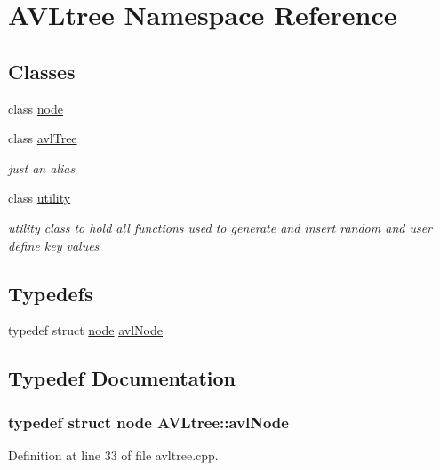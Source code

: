 \hypertarget{namespace_a_v_ltree}{\section{A\-V\-Ltree Namespace Reference}
\label{namespace_a_v_ltree}
}
\subsection*{Classes}
\begin{DoxyCompactItemize}
\item 
class \hyperlink{class_a_v_ltree_1_1node}{node}
\item 
class \hyperlink{class_a_v_ltree_1_1avl_tree}{avl\-Tree}
\begin{DoxyCompactList}\small\item\em just an alias \end{DoxyCompactList}\item 
class \hyperlink{class_a_v_ltree_1_1utility}{utility}
\begin{DoxyCompactList}\small\item\em utility class to hold all functions used to generate and insert random and user define key values \end{DoxyCompactList}\end{DoxyCompactItemize}
\subsection*{Typedefs}
\begin{DoxyCompactItemize}
\item 
typedef struct \hyperlink{class_a_v_ltree_1_1node}{node} \hyperlink{namespace_a_v_ltree_a563d9b152f0d58a69308eeec8d716882}{avl\-Node}
\end{DoxyCompactItemize}


\subsection{Typedef Documentation}
\hypertarget{namespace_a_v_ltree_a563d9b152f0d58a69308eeec8d716882}{
\subsubsection[{avl\-Node}]{\setlength{\rightskip}{0pt plus 5cm}typedef struct {\bf node} {\bf A\-V\-Ltree\-::avl\-Node}}}\label{namespace_a_v_ltree_a563d9b152f0d58a69308eeec8d716882}


Definition at line 33 of file avltree.\-cpp.

